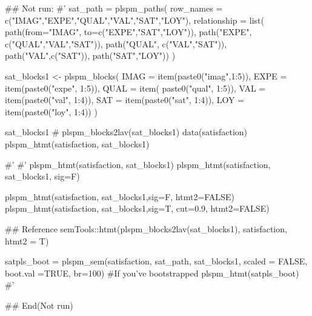 \documentclass[a4paper]{book}
\begin{document}
\begin{Examples}
\begin{ExampleCode}
\#\# Not run: 
#'
sat_path = plspm_paths(
row_names = c("IMAG","EXPE","QUAL","VAL","SAT","LOY"),
relationship = list(
  path(from="IMAG", to=c("EXPE","SAT","LOY")),
  path("EXPE", c("QUAL","VAL","SAT")),
  path("QUAL", c("VAL","SAT")),
  path("VAL",c("SAT")),
  path("SAT","LOY"))
)

sat_blocks1 <- plspm_blocks(
  IMAG = item(paste0("imag",1:5)),
  EXPE = item(paste0("expe", 1:5)),
  QUAL = item( paste0("qual", 1:5)),
  VAL = item(paste0("val", 1:4)),
  SAT = item(paste0("sat", 1:4)),
  LOY = item(paste0("loy", 1:4))
)

sat_blocks1
# plspm_blocks2lav(sat_blocks1) %
data(satisfaction)
plspm_htmt(satisfaction, sat_blocks1)

#'
#'
plspm_htmt(satisfaction, sat_blocks1)
plspm_htmt(satisfaction, sat_blocks1, sig=F)

plspm_htmt(satisfaction, sat_blocks1,sig=F, htmt2=FALSE)
plspm_htmt(satisfaction, sat_blocks1,sig=T, cut=0.9, htmt2=FALSE)

## Reference
semTools::htmt(plspm_blocks2lav(sat_blocks1),
               satisfaction,
               htmt2 = T)

 satpls_boot = plspm_sem(satisfaction, sat_path, sat_blocks1,
  scaled = FALSE, boot.val =TRUE, br=100)
 #If you've bootstrapped
 plspm_htmt(satpls_boot)
#'


## End(Not run)



\end{ExampleCode}
\end{Examples}
\end{document}
